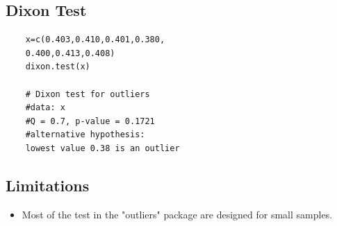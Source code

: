 \documentclass[a4paper,12pt]{article}
\begin{document}
\subsection{Dixon Test}
\begin{framed}
	\begin{verbatim}
	x=c(0.403,0.410,0.401,0.380,
	0.400,0.413,0.408)
	dixon.test(x)
	
	# Dixon test for outliers
	#data: x
	#Q = 0.7, p-value = 0.1721
	#alternative hypothesis: 
	lowest value 0.38 is an outlier
	\end{verbatim}
\end{framed}





\subsection{Limitations}
\begin{itemize}
	\item Most of the test in the "outliers" package are designed for small samples. 
\end{itemize}
\end{document}
